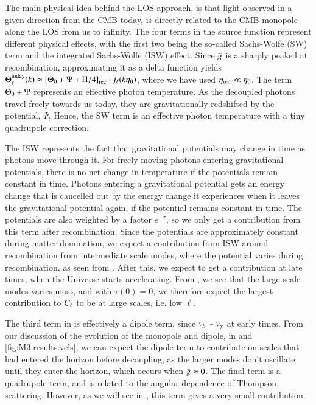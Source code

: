The main physical idea behind the LOS approach, is that light observed in a given direction from the CMB today, is directly related to the CMB monopole along the LOS from us to infinity. The four terms in the source function represent different physical effects, with the first two being the so-called Sachs-Wolfe (SW) term and the integrated Sachs-Wolfe (ISW) effect. Since $\tilde{g}$ is a sharply peaked at recombination, approximating it as a delta function yields $\Theta_\ell^\mathrm{today}(k)\approx \left[ \Theta_0 + \Psi + \Pi/4 \right]_\mathrm{rec}\cdot j_\ell(k\eta_0)$, where we have used $\eta_\mathrm{rec}\ll\eta_0$. The term $\Theta_0+\Psi$ represents an effective photon temperature. As the decoupled photons travel freely towards us today, they are gravitationally redshifted by the potential, $\Psi$. Hence, the SW term is an effective photon temperature with a tiny quadrupole correction.

The ISW represents the fact that gravitational potentials may change in time as photons move through it. For freely moving photons entering gravitational potentials, there is no net change in temperature if the potentials remain constant in time. Photons entering a gravitational potential gets an energy change that is cancelled out by the energy change it experiences when it leaves the gravitational potential again, if the potential remains constant in time.  The potentials are also weighted by a factor $e^{-\tau}$, so we only get a contribution from this term after recombination. Since the potentials are approximately constant during matter domination, we expect a contribution from ISW around recombination from intermediate scale modes, where the potential varies during recombination, as seen from . After this, we expect to get a contribution at late times, when the Universe starts accelerating. From , we see that the large scale modes varies most, and with $\tau(0)=0$, we therefore expect the largest contribution to $C_\ell$ to be at large scales, i.e. low $\ell$.  

The third term in  is effectively a dipole term, since $v_b\sim v_\gamma$ at early times. From our discussion of the evolution of the monopole and dipole, in  and \ref{fig:M3:results:vels}, we can expect the dipole term to contribute on scales that had entered the horizon before decoupling, as the larger modes don't oscillate until they enter the horizon, which occurs when $\tilde{g}\approx0$. The final term is a quadrupole term, and is related to the angular dependence of Thompson scattering. However, as we will see in , this term gives a very small contribution.

